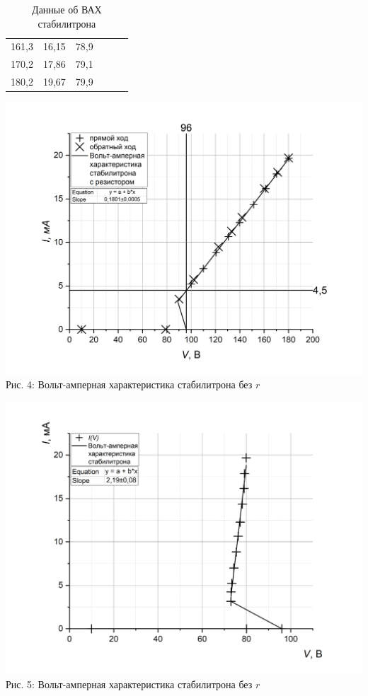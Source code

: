 \documentclass[a4paper, 12pt]{article}%
\begin{document}
\begin{table}[ht]
\begin{center}
\begin{tabular}{|c|c|c|ccc}
161,3  & 16,15   & 78,9               &                             &                              &                                         \\ \cline{1-3}
170,2  & 17,86   & 79,1               &                             &                              &                                         \\ \cline{1-3}
180,2  & 19,67   & 79,9               &                             &                              &                                         \\ \cline{1-3}
\end{tabular}
\end{center}
\caption{Данные об ВАХ стабилитрона}
\end{table}

\begin{center}
\includegraphics[width = \textwidth]{2.jpg}
Рис. 4: Вольт-амперная характеристика стабилитрона без $r$
\end{center}
\begin{center}
\includegraphics[width = \textwidth]{1.jpg}
Рис. 5: Вольт-амперная характеристика стабилитрона без $r$
\end{center}
\end{document}
